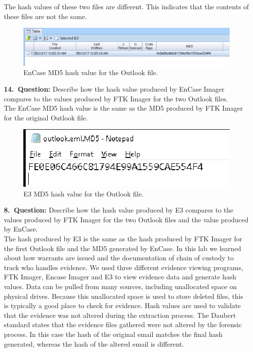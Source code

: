 The hash values of these two files are different.
This indicates that the contents of these files are not the same.

\begin{figure}[H]
    \centering
    \includegraphics[width=\linewidth]{figures/md5.png}
    \caption{EnCase MD5 hash value for the Outlook file.}
    \label{fig:encase}
\end{figure}

\textbf{14.\ Question:} Describe how the hash value produced by EnCase Imager compares to the values produced by FTK Imager for the two Outlook files.\\
The EnCase MD5 hash value is the same as the MD5 produced by  FTK Imager for the original Outlook file.

\begin{figure}[H]
    \centering
    \includegraphics[width=\linewidth]{figures/outlook.eml.md5.png}
    \caption{E3 MD5 hash value for the Outlook file.}
    \label{fig:e3}
\end{figure}

\textbf{8.\ Question:} Describe how the hash value produced by E3 compares to the values produced by FTK Imager for the two Outlook files and the value produced by EnCase.\\
The hash produced by E3 is the same as the hash produced by FTK Imager for the first Outlook file and the MD5 generated by EnCase.
\newpage
In this lab we learned about how warrants are issued and the documentation of chain of custody to track who handles evidence.
We used three different evidence viewing programs, FTK Imager, Encase Imager and E3 to view evidence data and generate hash values.
Data can be pulled from many sources, including unallocated space on physical drives.
Because this unallocated space is used to store deleted files, this is typically a good place to check for evidence.
Hash values are used to validate that the evidence was not altered during the extraction process.
The Daubert standard states that the evidence files gathered were not altered by the forensic process.
In this case the hash of the original email matches the final hash generated, whereas the hash of the altered email is different.